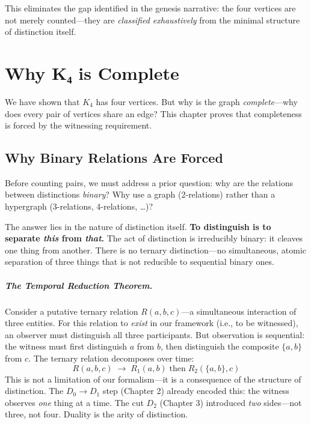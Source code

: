 \documentclass[11pt,a4paper]{book}
\begin{document}
This eliminates the gap identified in the genesis narrative: the four vertices are not
merely counted—they are \emph{classified exhaustively} from the minimal structure of
distinction itself.

\chapter{Why K₄ is Complete}
\label{chap:why-complete}

We have shown that $K_4$ has four vertices. But why is the graph \emph{complete}—why 
does every pair of vertices share an edge? This chapter proves that completeness 
is forced by the witnessing requirement.

\section{Why Binary Relations Are Forced}
\label{sec:binary-forced}

Before counting pairs, we must address a prior question: why are the relations 
between distinctions \emph{binary}? Why use a graph (2-relations) rather than a 
hypergraph (3-relations, 4-relations, \ldots)?

The answer lies in the nature of distinction itself. \textbf{To distinguish is to 
separate \emph{this} from \emph{that}.} The act of distinction is irreducibly binary: 
it cleaves one thing from another. There is no ternary distinction---no simultaneous, 
atomic separation of three things that is not reducible to sequential binary ones.

\paragraph{The Temporal Reduction Theorem.}
Consider a putative ternary relation $R(a, b, c)$---a simultaneous interaction of 
three entities. For this relation to \emph{exist} in our framework (i.e., to be 
witnessed), an observer must distinguish all three participants. But observation is 
sequential: the witness must first distinguish $a$ from $b$, then distinguish the 
composite $\{a, b\}$ from $c$. The ternary relation decomposes over time:
\[
R(a, b, c) \;\longrightarrow\; R_1(a, b) \;\text{then}\; R_2(\{a,b\}, c)
\]
This is not a limitation of our formalism---it is a consequence of the structure 
of distinction. The $D_0 \to D_1$ step (Chapter 2) already encoded this: the witness 
observes \emph{one} thing at a time. The cut $D_2$ (Chapter 3) introduced \emph{two} 
sides---not three, not four. Duality is the arity of distinction.
\end{document}
